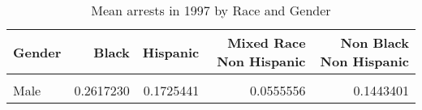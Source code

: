 \begin{table}[H]

\caption{\label{tab:tab:summarystats}Mean arrests in 1997 by Race and Gender}
\centering
\begin{tabular}[t]{lrrrr}
\toprule
Gender & Black & Hispanic & Mixed Race Non Hispanic & Non Black Non Hispanic\\
\midrule
\cellcolor{gray!6}{Female} & \cellcolor{gray!6}{0.0500481} & \cellcolor{gray!6}{0.0251497} & \cellcolor{gray!6}{0.0967742} & \cellcolor{gray!6}{0.0510659}\\
Male & 0.2617230 & 0.1725441 & 0.0555556 & 0.1443401\\
\bottomrule
\end{tabular}
\end{table}
